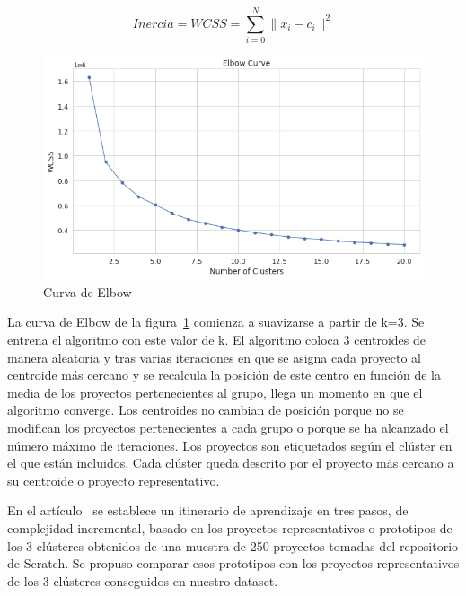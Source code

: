 \documentclass[a4paper, 12pt]{book}
\begin{document}
\begin{equation}
    Inercia=WCSS=\sum \limits _{i=0}^{N} \|{x_i-c_i\|^2}
    \label{eq:inercia}
\end{equation}

\begin{figure}
    \centering
    \includegraphics[width=.7\textwidth]{img/elbow_Scratch}
    \caption{Curva de Elbow}
    \label{fig:elbow_Scratch}
\end{figure}

La curva de Elbow de la figura~\ref{fig:elbow_Scratch} comienza a suavizarse a partir de k=3. Se entrena el algoritmo con este valor de k. El algoritmo coloca 3 centroides de manera aleatoria y tras varias iteraciones en que se asigna cada proyecto al centroide más cercano y se recalcula la posición de este centro en función de la media de los proyectos pertenecientes al grupo, llega un momento en que el algoritmo converge. Los centroides no cambian de posición porque no se modifican los proyectos pertenecientes a cada grupo o porque se ha alcanzado el número máximo de iteraciones. Los proyectos son etiquetados según el clúster en el que están incluidos. Cada clúster queda descrito por el proyecto más cercano a su centroide o proyecto representativo.

En el artículo~\cite{moreno17:_paths} se establece un itinerario de aprendizaje en tres pasos, de complejidad incremental, basado en los proyectos representativos o prototipos de los 3 clústeres obtenidos de una muestra de 250 proyectos tomadas del repositorio de Scratch. Se propuso comparar esos prototipos con los proyectos representativos de los 3 clústeres conseguidos en nuestro dataset.  
\end{document}
